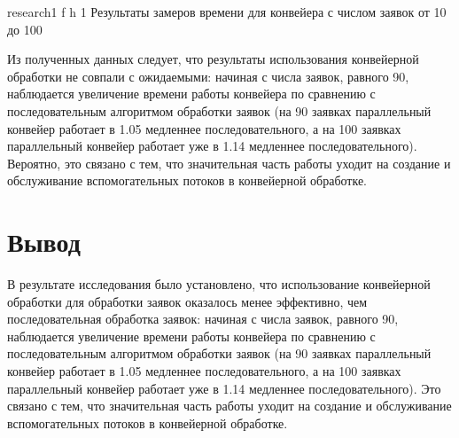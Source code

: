 \clearpage

{research1} %
{f} %
{h} %
{1\textwidth} %
{Результаты замеров времени для конвейера с числом заявок от 10 до 100} %

Из полученных данных следует, что результаты использования конвейерной обработки не совпали с ожидаемыми: начиная с числа заявок, равного 90, наблюдается увеличение времени работы конвейера по сравнению с последовательным алгоритмом обработки заявок (на 90 заявках параллельный конвейер работает в 1.05 медленнее последовательного, а на 100 заявках параллельный конвейер работает уже в 1.14 медленнее последовательного). Вероятно, это связано с тем, что значительная часть работы уходит на создание и обслуживание вспомогательных потоков в конвейерной обработке.

\clearpage

\section*{Вывод}

В результате исследования было установлено, что использование конвейерной обработки  для обработки заявок оказалось менее эффективно, чем последовательная обработка заявок: начиная с числа заявок, равного 90, наблюдается увеличение времени работы конвейера по сравнению с последовательным алгоритмом обработки заявок (на 90 заявках параллельный конвейер работает в 1.05 медленнее последовательного, а на 100 заявках параллельный конвейер работает уже в 1.14 медленнее последовательного). Это связано с тем, что значительная часть работы уходит на создание и обслуживание вспомогательных потоков в конвейерной обработке.

